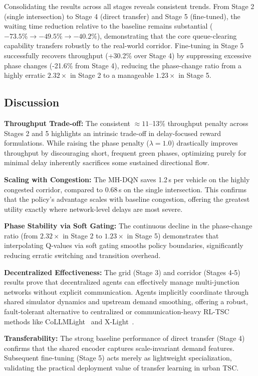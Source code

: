 \documentclass[lettersize,journal]{IEEEtran}
\begin{document}
Consolidating the results across all stages reveals consistent trends. From Stage 2 (single intersection) to Stage 4 (direct transfer) and Stage 5 (fine-tuned), the waiting time reduction relative to the baseline remains substantial ($-73.5\% \to -49.5\% \to -40.2\%$), demonstrating that the core queue-clearing capability transfers robustly to the real-world corridor. Fine-tuning in Stage 5 successfully recovers throughput (+30.2\% over Stage 4) by suppressing excessive phase changes (-21.6\% from Stage 4), reducing the phase-change ratio from a highly erratic $2.32\times$ in Stage 2 to a manageable $1.23\times$ in Stage 5.

\subsection{Discussion}

\textbf{Throughput Trade-off:} The consistent $\approx11$--13\% throughput penalty across Stages 2 and 5 highlights an intrinsic trade-off in delay-focused reward formulations. While raising the phase penalty ($\lambda=1.0$) drastically improves throughput by discouraging short, frequent green phases, optimizing purely for minimal delay inherently sacrifices some sustained directional flow.

\textbf{Scaling with Congestion:} The MH-DQN saves 1.2\,s per vehicle on the highly congested corridor, compared to 0.68\,s on the single intersection. This confirms that the policy's advantage scales with baseline congestion, offering the greatest utility exactly where network-level delays are most severe.

\textbf{Phase Stability via Soft Gating:} The continuous decline in the phase-change ratio (from $2.32\times$ in Stage 2 to $1.23\times$ in Stage 5) demonstrates that interpolating Q-values via soft gating smooths policy boundaries, significantly reducing erratic switching and transition overhead.

\textbf{Decentralized Effectiveness:} The grid (Stage 3) and corridor (Stages 4-5) results prove that decentralized agents can effectively manage multi-junction networks without explicit communication. Agents implicitly coordinate through shared simulator dynamics and upstream demand smoothing, offering a robust, fault-tolerant alternative to centralized or communication-heavy RL-TSC methods like CoLLMLight~\cite{yuan2025collmlight} and X-Light~\cite{jiang2024xlight}.

\textbf{Transferability:} The strong baseline performance of direct transfer (Stage 4) confirms that the shared encoder captures scale-invariant demand features. Subsequent fine-tuning (Stage 5) acts merely as lightweight specialization, validating the practical deployment value of transfer learning in urban TSC.
\end{document}
